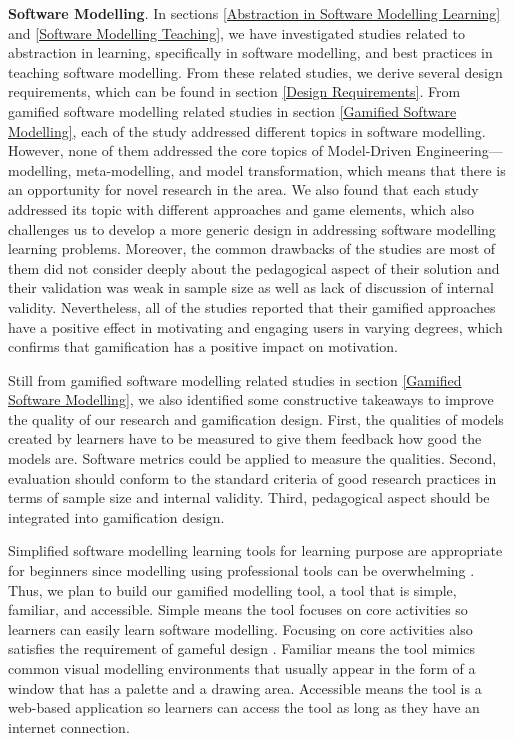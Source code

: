 \documentclass[12pt, a4paper]{report}
\begin{document}
{\textbf{Software Modelling}. In sections \ref{Abstraction in Software Modelling Learning} and \ref{Software Modelling Teaching}, we have investigated studies related to abstraction in learning, specifically in software modelling, and best practices in teaching software modelling. From these related studies, we derive several design requirements, which can be found in section \ref{Design Requirements}.      From gamified software modelling related studies in section \ref{Gamified Software Modelling}, each of the study addressed different topics in software modelling. However, none of them addressed the core topics of Model-Driven Engineering---modelling, meta-modelling, and model transformation, which means that there is an opportunity for novel research in the area. We also found that each study addressed its topic with different approaches and game elements, which also challenges us to develop a more generic design in addressing software modelling learning problems. Moreover, the common drawbacks of the studies are most of them did not consider deeply about the pedagogical aspect of their solution and their validation was weak in sample size as well as lack of discussion of internal validity. Nevertheless, all of the studies reported that their gamified approaches have a positive effect in motivating and engaging users in varying degrees, which confirms that gamification has a positive impact on motivation.

Still from gamified software modelling related studies in section \ref{Gamified Software Modelling}, we also identified some constructive takeaways to improve the quality of our research and gamification design. First, the qualities of models created by learners have to be measured to give them feedback how good the models are. Software metrics could be applied to measure the qualities. Second, evaluation should conform to the standard criteria of good research practices in terms of sample size and internal validity. Third, pedagogical aspect should be integrated into gamification design.       

Simplified software modelling learning tools for learning purpose are appropriate for beginners since modelling using professional tools can be overwhelming \cite{dranidis2015learning, Akayama2013}. Thus, we plan to build our gamified modelling tool, a tool that is simple, familiar, and accessible. Simple means the tool focuses on core activities so learners can easily learn software modelling. Focusing on core activities also satisﬁes the requirement of gameful design \cite{deterding2015lens}. Familiar means the tool mimics common visual modelling environments that usually appear in the form of a window that has a palette and a drawing area. Accessible means the tool is a web-based application so learners can access the tool as long as they have an internet connection.

}
\end{document}
